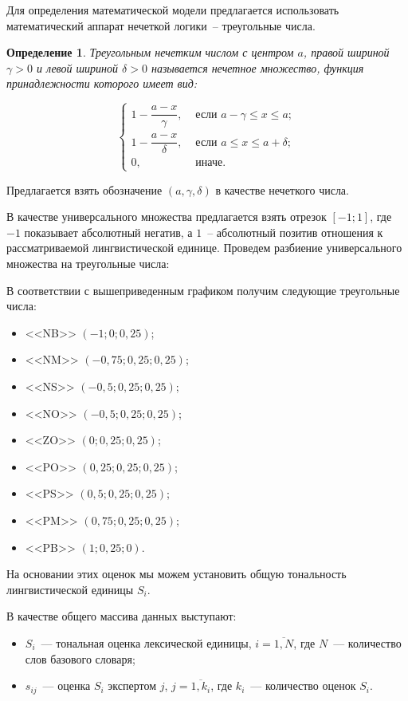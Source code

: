 \documentclass[a4paper,14pt,russian]{extreport}
\newtheorem{Def}{Определение} %
\begin{document}
Для определения математической модели предлагается использовать математический аппарат нечеткой логики~-- треугольные числа.

\begin{Def}
Треугольным нечетким числом с центром $a$, правой шириной $\gamma>0$ и левой шириной $\delta>0$ называется нечетное множество, функция принадлежности которого имеет вид:

\begin{equation}
\left\{
\begin{aligned}
1 - \dfrac{a-x}{\gamma}, &\text{ если } a-\gamma\leq x\leq a; \\
1 - \dfrac{a-x}{\delta}, &\text{ если } a\leq x\leq a+\delta; \\
0, &\text{ иначе}.
\end{aligned}
\right.
\end{equation}
\end{Def}

Предлагается взять обозначение $\left(a,\gamma, \delta\right)$ в качестве нечеткого числа.

В качестве универсального множества предлагается взять отрезок $\left[-1;1\right]$, где $-1$ показывает абсолютный негатив, а $1$~-- абсолютный позитив отношения к рассматриваемой лингвистической единице. Проведем разбиение универсального множества на треугольные числа:

В соответствии с вышеприведенным графиком получим следующие треугольные числа:

\begin{itemize}
\item <<NB>> $\left(-1;0;0,25\right)$;
\item <<NM>> $\left(-0,75;0,25;0,25\right)$;
\item <<NS>> $\left(-0,5;0,25;0,25\right)$;
\item <<NO>> $\left(-0,5;0,25;0,25\right)$;
\item <<ZO>> $\left(0;0,25;0,25\right)$;
\item <<PO>> $\left(0,25;0,25;0,25\right)$;
\item <<PS>> $\left(0,5;0,25;0,25\right)$;
\item <<PM>> $\left(0,75;0,25;0,25\right)$;
\item <<PB>> $\left(1;0,25;0\right)$.
\end{itemize}

На основании этих оценок мы можем установить общую тональность лингвистической единицы $S_i$.

В качестве общего массива данных выступают:
\begin{itemize}
\item $S_i$~--- тональная оценка лексической единицы, $i=\overline{1,N}$, где $N$~--- количество слов базового словаря;
\item $s_{ij}$~--- оценка $S_i$ экспертом $j$, $j=\overline{1,k_i}$, где $k_i$~--- количество оценок $S_i$.
\end{itemize}
\end{document}
